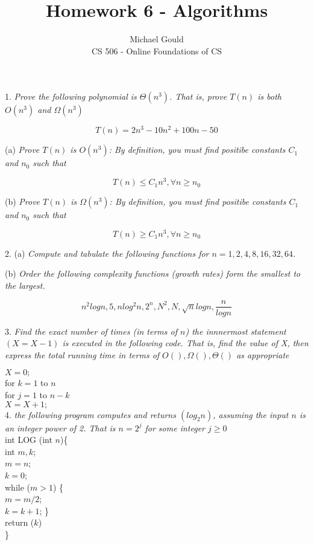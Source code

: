 \documentclass[10pt]{article}
\newcommand\tab[1][.5cm]{\hspace*{#1}}
\begin{document}
\title{Homework 6 - Algorithms}
\author{Michael Gould\\ 
CS 506 - Online Foundations of CS}

\maketitle

1. \textit{Prove the following polynomial is $\Theta(n^3)$.  That is, prove $T(n)$ is both $O(n^3)$ and $\Omega(n^3)$}

$$T(n) = 2n^3 - 10n^2 + 100n - 50$$

(a) \textit{Prove $T(n)$ is $O(n^3)$: By definition, you must find positibe constants $C_1$ and $n_0$ such that}

$$T(n) \leq C_1n^3, \forall n \geq n_0$$

(b) \textit{Prove $T(n)$ is $\Omega(n^3)$: By definition, you must find positibe constants $C_1$ and $n_0$ such that}

$$T(n) \geq C_1n^3, \forall n \geq n_0$$

2. (a) \textit{Compute and tabulate the following functions for $ n=1,2,4,8,16,32,64$.}

(b) \textit{Order the following complexity functions (growth rates) form the smallest to the largest.}

$$n^2 log n, 5, n log^2 n, 2^n, N^2, N, \sqrt{n} log n, \frac{n}{log n}$$

3. \textit{Find the exact number of times (in terms of $n$) the innnermost statement $(X=X-1)$ is executed in the following code.  That is, find the value of X, then express the total running time in terms of $O(),\Omega(),\Theta()$ as appropriate}

$X = 0;$\\
  \tab for $k=1$ to $n$\\
  \tab \tab for $j=1$ to $n-k$\\
  \tab \tab \tab $X=X+1;$\\

4. \textit{the following program computes and returns $(log_2n)$, assuming the input $n$ is an integer power of 2.  That is $n=2^j$ for some integer $j\geq0$}\\
\tab int LOG (int $n$)\{\\
\tab int $m,k$;\\
\tab $m=n$;\\
\tab $k=0$;\\
\tab while ($m>1$) \{\\
\tab \tab $m=m/2$;\\
\tab \tab $k=k+1$; \}\\
\tab return ($k$)\\
\tab \}
\end{document}
